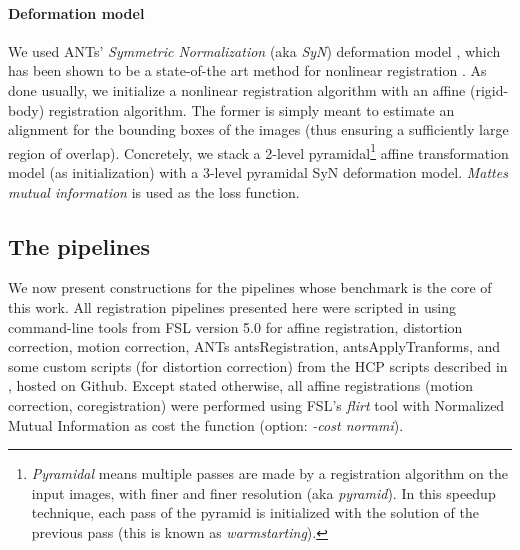 \paragraph{Deformation model}
We used ANTs' \textit{Symmetric Normalization} (aka \textit{SyN})
deformation model \citep{avants2008,avants2011}, which has been shown
to be a state-of-the art method for nonlinear registration
\citep{pmid19195496}. As done usually, we initialize a nonlinear
registration algorithm with an affine (rigid-body) registration
algorithm.
%
The former is simply meant to estimate an alignment for the
bounding boxes of the images (thus ensuring a sufficiently large
region of overlap). Concretely, we stack a 2-level
pyramidal\footnote{\textit{Pyramidal} means multiple passes are
made by a registration algorithm on the input images, with finer
and finer resolution (aka \textit{pyramid}). In this speedup technique, each
pass of the pyramid is initialized with the solution of the
previous pass (this is known as \textit{warmstarting}).}  affine
transformation model (as initialization) with a 3-level pyramidal
SyN deformation model. \textit{Mattes mutual information}
\citep{mattes2003} is used as the loss function.


\subsection{The pipelines}
\label{sec:pipelines}
We now present constructions for the pipelines whose benchmark is the
core of this work. All registration pipelines presented here were
scripted in using command-line tools from FSL version 5.0
\citep{smith2004} for affine registration, distortion correction,
motion correction, ANTs \citep{avants2009advanced}
antsRegistration, antsApplyTranforms, and some custom scripts
(for distortion correction) from the HCP scripts described in
\citep{glasser2013}, hosted on Github.
Except stated otherwise, all affine registrations (motion correction,
coregistration) were performed using FSL's \textit{flirt} tool
\citep{smith2004} with Normalized Mutual Information as cost the function (option: \textit{-cost
  normmi}).

